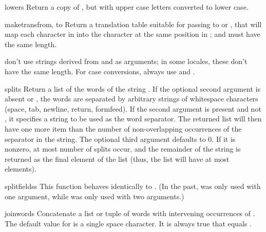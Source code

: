 \begin{funcdesc}{lower}{s}
  Return a copy of , but with upper case letters converted to
  lower case.
\end{funcdesc}

\begin{funcdesc}{maketrans}{from, to}
  Return a translation table suitable for passing to
   or , that will map
  each character in  into the character at the same position
  in ;  and  must have the same length.

   don't use strings derived from 
  and  as arguments; in some locales, these don't have
  the same length.  For case conversions, always use
   and .
\end{funcdesc}

\begin{funcdesc}{split}{s}
  Return a list of the words of the string .  If the optional
  second argument  is absent or , the words are
  separated by arbitrary strings of whitespace characters (space, tab, 
  newline, return, formfeed).  If the second argument  is
  present and not , it specifies a string to be used as the 
  word separator.  The returned list will then have one more item
  than the number of non-overlapping occurrences of the separator in
  the string.  The optional third argument  defaults to
  0.  If it is nonzero, at most  number of splits occur,
  and the remainder of the string is returned as the final element of
  the list (thus, the list will have at most 
  elements).
\end{funcdesc}

\begin{funcdesc}{splitfields}{s}
  This function behaves identically to .  (In the
  past,  was only used with one argument, while
   was only used with two arguments.)
\end{funcdesc}

\begin{funcdesc}{join}{words}
  Concatenate a list or tuple of words with intervening occurrences of 
  .  The default value for  is a single space
  character.  It is always true that
  equals .
\end{funcdesc}

